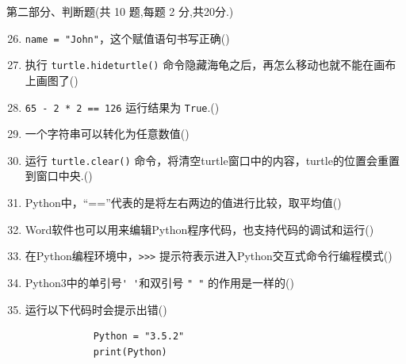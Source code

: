 \documentclass[11pt]{ctexart}
\begin{document}
    {\noindent\heiti 第二部分、判断题(共 10 题,每题 2 分,共20分.)}
    \begin{enumerate}
        \setcounter{enumi}{25}
        \item \lstinline{name = "John"}，这个赋值语句书写正确(\qquad)

        \item 执行 \lstinline{turtle.hideturtle()} 命令隐藏海龟之后，再怎么移动也就不能在画布上画图了(\qquad)
        
        \item \lstinline!65 - 2 * 2 == 126! 运行结果为 \lstinline{True}.(\qquad)
  
        \item 一个字符串可以转化为任意数值(\qquad)
        
        \item 运行 \lstinline{turtle.clear()} 命令，将清空turtle窗口中的内容，turtle的位置会重置到窗口中央.(\qquad)
        
        \item Python中，“==”代表的是将左右两边的值进行比较，取平均值(\qquad)
        
        \item Word软件也可以用来编辑Python程序代码，也支持代码的调试和运行(\qquad)
        
        \item 在Python编程环境中，\lstinline!>>>! 提示符表示进入Python交互式命令行编程模式(\qquad)
        
        \item Python3中的单引号\lstinline{' '}和双引号 \lstinline{" "} 的作用是一样的(\qquad)
        
        \item 运行以下代码时会提示出错(\qquad)
        \begin{lstlisting}
            Python = "3.5.2"
            print(Python)
        \end{lstlisting}
    \end{enumerate}
\end{document}

